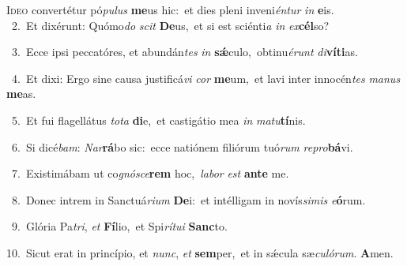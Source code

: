 \lettrine{\initial\textcolor{\initialcolor}{I}}{deo} convertétur pó\-\textit{pu}\-\textit{lus} \textbf{me}\-us hic:~\star et dies pleni inveni\-\textit{én}\-\textit{tur} \textit{in} \textbf{e}\-is.\\
{\numbfont\textcolor{\numbcolor}{~2.}}~Et dixérunt: Quómo\textit{do} \textit{scit} \textbf{De}\-us,~\star et si est sciénti\textit{a} \textit{in} \textit{ex}\-\textbf{cél}so?\par
{\numbfont\textcolor{\numbcolor}{~3.}}~Ecce ipsi peccatóres, et abundán\textit{tes} \textit{in} \textbf{sǽ}\-culo,~\star obtinu\-\textit{é}\-\textit{runt} \textit{di}\-\textbf{ví}\textbf{ti}as.\par
{\numbfont\textcolor{\numbcolor}{~4.}}~Et dixi: Ergo sine causa justificá\textit{vi} \textit{cor} \textbf{me}\-um,~\star et lavi inter innocén\textit{tes} \textit{ma}\-\textit{nus} \textbf{me}\-as.\par
{\numbfont\textcolor{\numbcolor}{~5.}}~Et fui flagellátus \textit{to}\-\textit{ta} \textbf{di}\-e,~\star et castigátio mea \textit{in} \textit{ma}\-\textit{tu}\textbf{tí}nis.\par
{\numbfont\textcolor{\numbcolor}{~6.}}~Si dicé\-\textit{bam}\-: \textit{Nar}\-\textbf{rá}bo sic:~\star ecce natiónem filiórum tuó\textit{rum} \textit{re}\-\textit{pro}\textbf{bá}vi.\par
{\numbfont\textcolor{\numbcolor}{~7.}}~Existimábam ut co\-\textit{gnó}\-\textit{sce}\textbf{rem} hoc,~\star \textit{la}\-\textit{bor} \textit{est} \textbf{an}\-\textbf{te} me.\par
{\numbfont\textcolor{\numbcolor}{~8.}}~Donec intrem in Sanctuá\-\textit{ri}\-\textit{um} \textbf{De}\-i:~\star et intélligam in novís\-\textit{si}\-\textit{mis} \textit{e}\-\textbf{ó}rum.\par
{\numbfont\textcolor{\numbcolor}{~9.}}~Glória Pa\-\textit{tri}\-, \textit{et} \textbf{Fí}\-lio,~\star et Spi\-\textit{rí}\-\textit{tu}\textit{i} \textbf{Sanc}\-to.\par
{\numbfont\textcolor{\numbcolor}{10.}}~Sicut erat in princípio, et \textit{nunc}\-, \textit{et} \textbf{sem}\-per,~\star et in sǽcula sæ\-\textit{cu}\-\textit{ló}\textit{rum}. \textbf{A}\-men.\par

